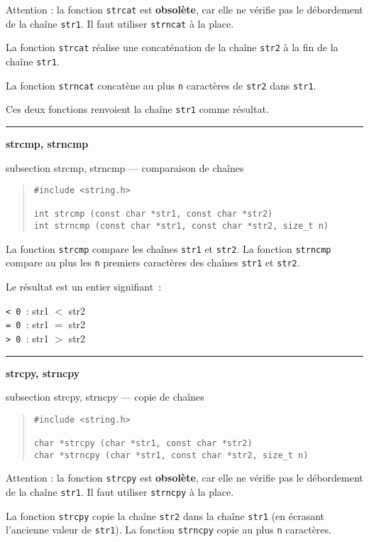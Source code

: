 \documentclass [twoside] {report}
\newcommand {\primitive} [1]
    {
	\phantomsection
	{\large \bf #1}
	\addcontentsline {toc} {subsection} {#1}
    }
\newcommand {\separation}
    {
	\vspace {5mm}
	\nopagebreak
	\hrule
    }
\begin{document}
Attention : la fonction \texttt {strcat} est \textbf {obsolète}, car elle ne
vérifie pas le débordement de la chaîne \texttt {str1}. Il faut
utiliser \texttt {strncat} à la place.

La fonction {\tt strcat} réalise une concaténation de la
chaîne {\tt str2} à la fin de la chaîne {\tt str1}.

La fonction {\tt strncat} concatène au plus {\tt n} caractères
de {\tt str2} dans {\tt str1}.

Ces deux fonctions renvoient la chaîne {\tt str1} comme
résultat.


\separation 
\primitive {strcmp, strncmp} --- comparaison de chaînes

\begin {quote}
\begin {verbatim}
#include <string.h>

int strcmp (const char *str1, const char *str2)
int strncmp (const char *str1, const char *str2, size_t n)
\end{verbatim}
\end {quote}

La fonction {\tt strcmp} compare les chaînes {\tt str1} et
{\tt str2}. La fonction {\tt strncmp} compare au plus les {\tt n}
premiers caractères des chaînes {\tt str1} et {\tt str2}.

Le résultat est un entier signifiant~:

{\tt < 0 }: str1 $<$ str2 \\
{\tt = 0 }: str1 $=$ str2 \\
{\tt > 0 }: str1 $>$ str2 


\separation 
\primitive {strcpy, strncpy} --- copie de chaînes

\begin {quote}
\begin {verbatim}
#include <string.h>

char *strcpy (char *str1, const char *str2)
char *strncpy (char *str1, const char *str2, size_t n)
\end{verbatim}
\end {quote}

Attention : la fonction \texttt {strcpy} est \textbf {obsolète}, car elle ne
vérifie pas le débordement de la chaîne \texttt {str1}. Il faut
utiliser \texttt {strncpy} à la place.

La fonction {\tt strcpy} copie la chaîne {\tt str2} dans la
chaîne {\tt str1} (en écrasant l'ancienne valeur de {\tt str1}).
La fonction {\tt strncpy} copie au plus {\tt n} caractères.
\end{document}
